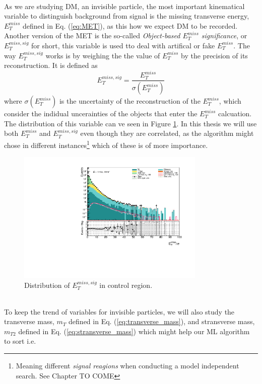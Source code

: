 \documentclass[12pt, a4paper]{book}
\begin{document}
\\As we are studying DM, an invisible particle, the most important kinematical variable to distinguish background from signal is the missing transverse energy, $E_T^{miss}$ defined in Eq. (\ref{eq:MET}), as this how we expect DM to be recorded.
Another version of the MET is the so-called \textit{Object-based $E_T^{miss}$ significance}, or $E_T^{miss,sig}$ for short, this variable is used tto deal with artifical or fake $E_T^{miss}$. The way $E_T^{miss,sig}$ works is by 
weighing the the value of $E_T^{miss}$ by the precision of its reconstruction. It is defined as
\begin{equation}\label{eq:METsig}
    E_T^{miss,sig} = \frac{E_T^{miss}}{\sigma(E_T^{miss})}
\end{equation}
where $\sigma(E_T^{miss})$ is the uncertainty of the reconstruction of the $E_T^{miss}$, which consider the indidual uncerainties of the objects that enter the $E_T^{miss}$ calcuation. The distribution of this variable can ve seen in Figure \ref{fig:met_sig_dist}. 
In this thesis we will use both $E_T^{miss}$ and $E_T^{miss,sig}$ even though they are correlated, as the algorithm might chose in different instances\footnote{Meaning different \textit{signal reagions} when conducting a model independent search. See Chapter TO COME} 
which of these is of more importance.
\begin{figure}[!ht]
    \centering
        \includegraphics[width=0.8\textwidth]{met_sig.pdf}
    \caption{Distribution of $E_{T}^{miss,sig}$ in control region.}\label{fig:met_sig_dist}
\end{figure}
\\To keep the trend of variables for invisible particles, we will also study the transverse mass, $m_T$ defined in Eq. (\ref{eq:transverse_mass}), and stransverse mass, $m_{T2}$ defined in Eq. (\ref{eq:stransverse_mass}) which might help our ML algorithm to sort i.e. 
\end{document}
